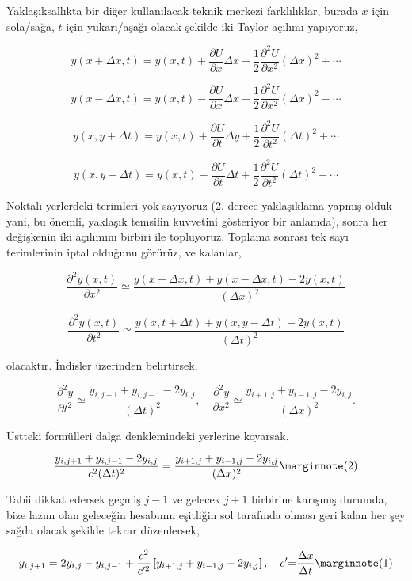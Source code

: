 \documentclass[12pt,fleqn]{article}\usepackage{../../common}
\begin{document}
Yaklaşıksallıkta bir diğer kullanılacak teknik merkezi farklılıklar, burada $x$
için sola/sağa, $t$ için yukarı/aşağı olacak şekilde iki Taylor açılımı
yapıyoruz,


$$
y(x +\Delta x, t)  = y(x,t) +
\frac{\partial U}{\partial x}\Delta x + \frac{1}{2}
\frac{\partial^2 U}{\partial x^2}(\Delta x)^2 + \cdots
$$

$$
y(x -\Delta x, t)  = y(x,t) -
\frac{\partial U}{\partial x} \Delta x + \frac{1} {2}
\frac{\partial^2 U}{\partial x^2} (\Delta x)^2 - \cdots
$$

$$
y(x, y +\Delta t)  = y(x,t) +
\frac{\partial U}{\partial t}\Delta y + \frac{1}{2}
\frac{\partial^2 U}{\partial t^2}(\Delta t)^2 + \cdots
$$

$$
y(x, y -\Delta t) = y(x,t) -
\frac{\partial U}{\partial t} \Delta t + \frac{1} {2}
\frac{\partial^2 U}{\partial t^2} (\Delta t)^2 - \cdots
$$

Noktalı yerlerdeki terimleri yok sayıyoruz (2. derece yaklaşıklama yapmış olduk
yani, bu önemli, yaklaşık temsilin kuvvetini gösteriyor bir anlamda), sonra her
değişkenin iki açılımını birbiri ile topluyoruz. Toplama sonrası tek sayı
terimlerinin iptal olduğunu görürüz, ve kalanlar,

$$
\frac{\partial^2 y(x,t)}{\partial x^2} \simeq
\frac{y(x+\Delta x,t)+y(x-\Delta x,t)-2 y(x,t)}{(\Delta x)^2}
$$

$$
\frac{\partial^2 y(x,t)}{\partial t^2} \simeq
\frac{y(x,t+\Delta t) +y(x, y-\Delta t)-2 y(x,t)}{(\Delta t)^2}
$$

olacaktır. İndisler üzerinden belirtirsek,

$$
\frac{\partial^2 y }{\partial t^2} \simeq
\frac{y_{i,j+1}+y_{i,j-1}-2 y_{i,j}}{(\Delta t)^2}, \quad
\frac{\partial^2 y}{\partial x^2} \simeq
\frac{y_{i+1,j}+y_{i-1,j}-2 y_{i,j}} {(\Delta x)^2}.
$$

Üstteki formülleri dalga denklemindeki yerlerine koyarsak,

$$
\frac{y_{i,j+1}+y_{i,j-1}-2 y_{i,j}} {c^2 (\Delta t)^2}  =
\frac{y_{i+1,j}+y_{i-1,j}-2 y_{i,j}} {(\Delta x)^2}
\mlabel{2}
$$

Tabii dikkat edersek geçmiş $j-1$ ve gelecek $j+1$ birbirine karışmış durumda,
bize lazım olan geleceğin hesabının eşitliğin sol tarafında olması geri kalan
her şey sağda olacak şekilde tekrar düzenlersek,

$$
y_{i,j+1}  = 2 y_{i,j}-y_{i,j-1}+ \frac{c^2 } {c'^{2}}
\left [ y_{i+1,j}+y_{i-1,j}-2 y_{i,j}\right], \quad c' { = }
\frac {\Delta x}{\Delta t}
\mlabel{1}
$$
\end{document}

